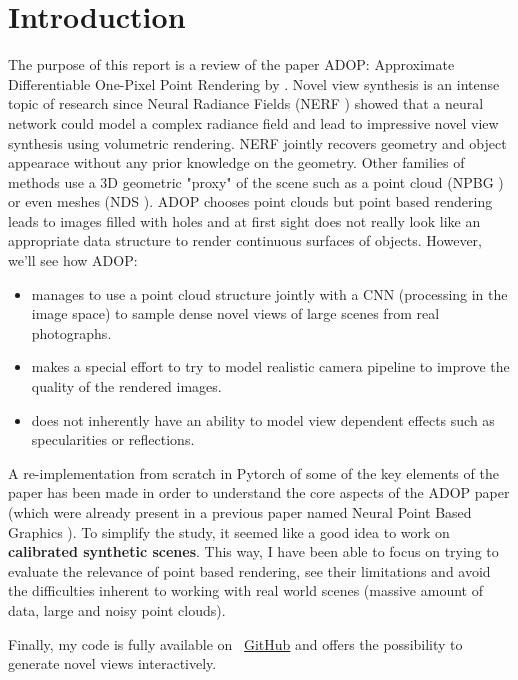 \section{Introduction}
\label{sec:intro}
The purpose of this report is a review of the paper ADOP: Approximate Differentiable One-Pixel Point Rendering by \citet{Aruckert2022adop}.
Novel view synthesis is an intense topic of research since Neural Radiance Fields (NERF \cite{mildenhall2020nerf}) showed that a neural network could model a complex radiance field and lead to impressive novel view synthesis using volumetric rendering. NERF jointly recovers geometry and object appearace without any prior knowledge on the geometry. 
Other families of methods use a 3D geometric "proxy" of the scene such as a point cloud (NPBG \cite{Aliev2020}) or even meshes (NDS \cite{worchel2022nds}). ADOP chooses point clouds but point based rendering leads to images filled with holes and at first sight does not really look like an appropriate data structure to render continuous surfaces of objects.
However, we'll see how ADOP:
\begin{itemize}
    \item manages to use a point cloud structure jointly with a CNN (processing in the image space) to sample dense novel views of large scenes from real photographs.
    \item makes a special effort to try to model realistic camera pipeline to improve the quality of the rendered images.
    \item does not inherently have an ability to model view dependent effects such as specularities or reflections.
\end{itemize}

A re-implementation from scratch in Pytorch of some of the key elements of the paper has been made in order to understand the core aspects of the ADOP paper (which were already present in a previous paper named Neural Point Based Graphics \cite{Aliev2020}). To simplify the study, it seemed like a good idea to work on \textbf{calibrated synthetic scenes}. This way, I have been able to focus on trying to evaluate the relevance of point based rendering, see their limitations and avoid the difficulties inherent to working with real world scenes (massive amount of data, large and noisy point clouds).

\noindent Finally, my code is fully available on ~\href{https://github.com/balthazarneveu/per-pixel-point-rendering}{GitHub} and offers the possibility to generate novel views interactively.
